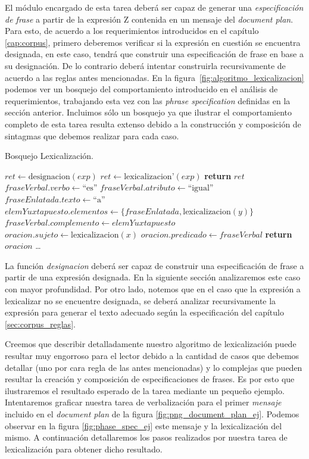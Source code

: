 El módulo encargado de esta tarea deberá ser capaz de generar una \emph{especificación de frase} a partir de la expresión Z contenida en un mensaje del \emph{document plan}. Para esto, de acuerdo a los requerimientos introducidos en el capítulo \ref{cap:corpus}, primero deberemos verificar si la expresión en cuestión se encuentra designada, en este caso, tendrá que construir una especificación de frase en base a su designación. De lo contrario deberá intentar construirla recursivamente de acuerdo a las reglas antes mencionadas. En la figura~\ref{fig:algoritmo_lexicalizacion} podemos ver un bosquejo del comportamiento introducido en el análisis de requerimientos, trabajando esta vez con las \emph{phrase specification} definidas en la sección anterior. Incluimos sólo un bosquejo ya que ilustrar el comportamiento completo de esta tarea resulta extenso debido a la construcción y composición de sintagmas que debemos realizar para cada caso. 

\begin{algorithm}[H]
\caption{Bosquejo Lexicalización.}
\begin{algorithmic}
\State $ret\gets \text{designacion}(exp)$
\Else
\State $ret\gets \text{lexicalizacion'}(exp)$
\EndIf
\State \textbf{return} $ret$
\EndFunction
\Statex
{}
\State $fraseVerbal.verbo\gets \text{``es''}$
\State $fraseVerbal.atributo\gets \text{``igual''}$
\State $fraseEnlatada.texto\gets \text{``a''}$
\State $elemYuxtapuesto.elementos\gets \{fraseEnlatada, \text{lexicalizacion}(y)\}$
\State $fraseVerbal.complemento\gets elemYuxtapuesto$
\State $oracion.sujeto\gets \text{lexicalizacion}(x)$
\State $oracion.predicado\gets fraseVerbal$
\State \textbf{return} $oracion$
\EndFunction
\Statex
\ldots
\end{algorithmic}
\label{fig:algoritmo_lexicalizacion}
\end{algorithm}

La función \emph{designacion} deberá ser capaz de construir una especificación de frase a partir de una expresión designada. En la siguiente sección analizaremos este caso con mayor profundidad. Por otro lado, notemos que en el caso que la expresión a lexicalizar no se encuentre designada, se deberá analizar recursivamente la expresión para generar el texto adecuado según la especificación del capítulo \ref{sec:corpus_reglas}. 

Creemos que describir detalladamente nuestro algoritmo de lexicalización puede resultar muy engorroso para el lector debido a la cantidad de casos que debemos detallar (uno por cara regla de las antes mencionadas) y lo complejas que pueden resultar la creación y composición de especificaciones de frases. Es por esto que ilustraremos el resultado esperado de la tarea mediante un pequeño ejemplo. Intentaremos graficar nuestra tarea de verbalización para el primer \emph{mensaje} incluido en el \textit{document plan} de la figura \ref{fig:png_document_plan_ej}. Podemos observar en la figura \ref{fig:phase_spec_ej} este mensaje y la lexicalización del mismo. A continuación detallaremos los pasos realizados por nuestra tarea de lexicalización para obtener dicho resultado.

